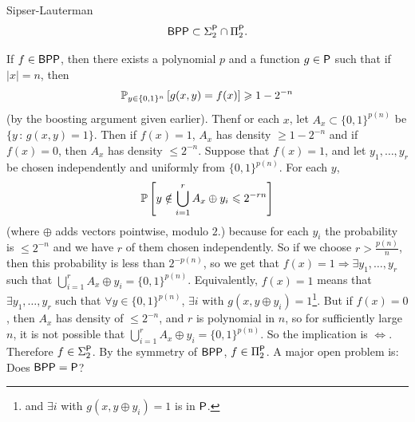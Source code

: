 \documentclass{article}
\begin{document}
\begin{fancythm}{Sipser-Lauterman}
    \[\mathsf{BPP} \subset \Sigma_{2}^{\mathsf{P}} \cap \Pi_{2}^{\mathsf{P}}.\]
\end{fancythm}
\proof \newlec If $f \in \mathsf{BPP}$, then there exists a polynomial $p$ and a function $g \in \mathsf{P}$ such that if $|x|=n$, then \[ \mathbb{P}_{y \in \{0,1\}^{n}}\left[ g(x,y)=f(x) \right] \geqslant 1- 2^{-n}\] (by the boosting argument given earlier). Thenf or each $x$, let $A_{x} \subset \{0,1\}^{p(n)}$ be $\{y \, : \, g(x,y)=1\}$. Then if $f(x)=1$, $A_{x}$ has density $\geq 1-2^{-n}$ and if $f(x)=0$, then $A_{x}$ has density $\leq 2^{-n}$. Suppose that $f(x)=1$, and let $y_{1},\dots, y_{r}$ be chosen independently and uniformly from $\{0,1\}^{p(n)}$. For each $y$, \[\mathbb{P}\left[ y \notin \bigcup _{i=1}^{r} A_{x} \oplus y_{i} \leqslant 2^{-rn} \right]\] (where $\oplus$ adds vectors pointwise, modulo $2$.) because for each $y_{i}$ the probability is $\leq 2^{-n}$ and we have $r$ of them chosen independently. So if we choose $r>\frac{p(n)}{n}$, then this probability is less than $2^{-p(n)}$, so we get that $f(x)=1 \Rightarrow \exists y_{1},\dots,y_{r}$ such that $\bigcup_{i=1}^{r} A_{x} \oplus y_{i} = \{0,1\}^{p(n)}$.\gap 
Equivalently, $f(x)=1$ means that $\exists y_{1},\dots,y_{r}$ such that $\forall y \in \{0,1\}^{p(n)}$, $\exists i$ with $g(x, y \oplus y_{i})=1$\footnote{ and $\exists i$ with $g(x, y \oplus y_{i})=1$ is in $\mathsf{P}$.}. But if $f(x)=0$, then $A_{x}$ has density of $\leq 2^{-n}$, and $r$ is polynomial in $n$, so for sufficiently large $n$, it is not possible that $\bigcup_{i=1}^{r}A_{x} \oplus y_{i} = \{0,1\}^{p(n)}$. So the implication is $\Leftrightarrow$. Therefore $f \in \Sigma_{2}^{\mathsf{P}}$. By the symmetry of $\mathsf{BPP}$, $f \in \Pi_{2}^{\mathsf{P}}$. \endproof 
A major open problem is: Does $\mathsf{BPP} = \mathsf{P}$?
\end{document}
